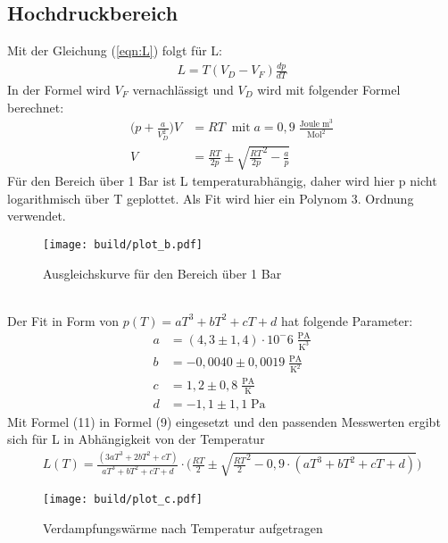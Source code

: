 \subsection{Hochdruckbereich}
Mit der Gleichung (\ref{eqn:L}) folgt für L:
\begin{align*}
    L = T(V_D - V_F) \frac{dp}{dT}
\end{align*}
In der Formel wird $V_F$ vernachlässigt und $V_D$ wird mit folgender Formel berechnet:
\begin{align*}
    \biggl( p+\frac{a}{V_D^2} \biggr) V &= RT\;\; \text{mit} \; a = 0,9 \; \frac{\text{Joule}\;{\text{m}}^3}{{\text{Mol}^2}}\\
    V &= \frac{RT}{2p} \pm \sqrt{{\frac{RT}{2p}}^2-\frac{a}{p}}
\end{align*}
Für den Bereich über 1 Bar ist L temperaturabhängig, daher wird hier p nicht logarithmisch über T geplottet.
Als Fit wird hier ein Polynom 3. Ordnung verwendet.
\begin{figure}
    \centering
    \texttt{[image: build/plot\_b.pdf]}
    \caption{Ausgleichskurve für den Bereich über 1 Bar}
    \label{fig:Hochdruck}
\end{figure}
\\Der Fit in Form von $p(T) = aT^3+bT^2+cT+d$ hat folgende Parameter:
\begin{align*}
    a &= (4,3\pm 1,4)\cdot 10^-6 \; \frac{\text{PA}}{\text{K}^3}\\
    b &= -0,0040\pm 0,0019 \; \frac{\text{PA}}{\text{K}^2}\\
    c &= 1,2\pm 0,8 \; \frac{\text{PA}}{\text{K}}\\
    d &= -1,1\pm 1,1  \; \text{Pa}
\end{align*}
Mit Formel (11) in Formel (9) eingesetzt und den passenden Messwerten ergibt sich für L in Abhängigkeit von der Temperatur
\begin{align*}
    L(T) = \frac{(3aT^3+2bT^2+cT)}{aT^3+bT^2+cT+d}\cdot \biggl( \frac{RT}{2} \pm \sqrt{\frac{RT}{2}^2 - 0,9 \cdot (aT^3+bT^2+cT+d)} \biggr)
\end{align*}
\begin{figure}
    \centering
    \texttt{[image: build/plot\_c.pdf]}
    \caption{Verdampfungswärme nach Temperatur aufgetragen}
    \label{fig:Hochdruck}
\end{figure}
